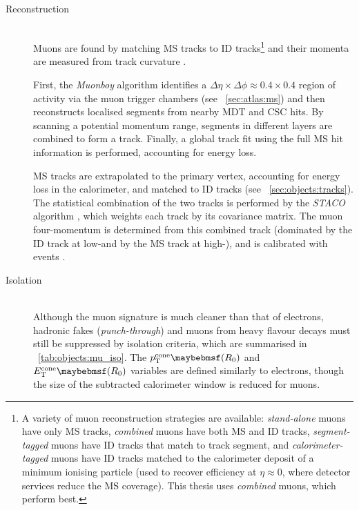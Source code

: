 \begin{description}
\item[Reconstruction] \hfill \\
	Muons are found by matching \ac{MS} tracks to \ac{ID} tracks\footnote{
		A variety of muon reconstruction strategies are available: \textit{stand-alone} 
		muons have only \ac{MS} tracks, \textit{combined} muons have both \ac{MS} and 
		\ac{ID} tracks, \textit{segment-tagged} muons have \ac{ID} tracks that match to 
		 track segment, and \textit{calorimeter-tagged} muons have \ac{ID} 
		tracks matched to the calorimeter deposit of a minimum ionising particle (used to 
		recover efficiency at $\eta \approx 0$, where detector services reduce the \ac{MS}
		coverage). This thesis uses \textit{combined} muons, which perform best.
	}
	and their momenta are measured from track curvature \cite{ATLAS:ExpectPerf}.

	First, the \textit{Muonboy} algorithm \cite{Muons:algorithms} identifies a 
	$\Delta\eta \times \Delta\phi \approx 0.4 \times 0.4$ region of activity via the muon 
	trigger chambers (see \Section~\ref{sec:atlas:ms}) and then reconstructs localised 
	segments from nearby \acs{MDT} and \acs{CSC} hits. By scanning a potential momentum 
	range, segments in different layers are combined to form a track. Finally, a global 
	track fit using the full \ac{MS} hit information is performed, accounting for energy 
	loss.

	\ac{MS} tracks are extrapolated to the primary vertex, accounting for energy loss in 
	the calorimeter, and matched to \ac{ID} tracks (see 
	\Section~\ref{sec:objects:tracks}). The statistical combination of the two 
	tracks is performed by the \textit{STACO} algorithm \cite{Muons:algorithms}, which
	weights each track by its covariance matrix. The muon four-momentum is determined 
	from this combined track (dominated by the \ac{ID} track at low-\pt and by the 
	\ac{MS} track at high-\pt), and is calibrated with \HepProcess{\PZ \HepTo \Pmu\Pmu}
	events \cite{Muons:2012}.

\item[Isolation] \hfill \\
	Although the muon signature is much cleaner than that of electrons, hadronic fakes 
	(\textit{punch-through}) and muons from heavy flavour decays must still be suppressed 
	by isolation criteria, which are summarised in \Table~\ref{tab:objects:mu_iso}. The 
	$p_{\text{T}}^{\text{cone}}\parenths{R_0}$ and 
	$E_{\text{T}}^{\text{cone}}\parenths{R_0}$ variables are defined similarly to 
	electrons, though the size of the subtracted calorimeter window is reduced for muons.


\end{description}
